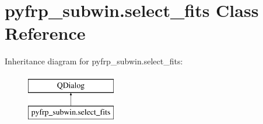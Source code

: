 \hypertarget{classpyfrp__subwin_1_1select__fits}{\section{pyfrp\+\_\+subwin.\+select\+\_\+fits Class Reference}
\label{classpyfrp__subwin_1_1select__fits}
}
Inheritance diagram for pyfrp\+\_\+subwin.\+select\+\_\+fits\+:\begin{figure}[H]
\begin{center}
\leavevmode
\includegraphics[height=2.000000cm]{classpyfrp__subwin_1_1select__fits}
\end{center}
\end{figure}
